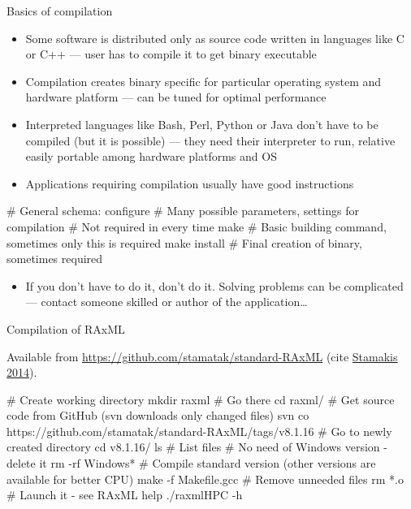 \documentclass[compress, ucs, xelatex, 11pt, xcolor=svgnames,
  hyperref={
    bookmarks=true,
    unicode=true,
    colorlinks=true,
    pdftitle={Linux, command line and MetaCentrum},
    plainpages=false,
    pdfauthor={Vojtech Zeisek},
    pdfsubject={Course about use of Linux command line, writing shell scripts and using MetaCentrum of CESNET},
    pdfcreator={XeLaTeX, http://www.xelatex.org/},
    pdfkeywords={Linux, GNU, BASH, shell, command line, MetaCentrum},
    linkcolor=Sienna,
    anchorcolor=black,
    citecolor=green,
    filecolor=magenta,
    menucolor=Sienna,
    urlcolor=cyan,
    pdftex},
  url={hyphens, lowtilde} %
  ]{beamer}
\begin{document}
\begin{frame}[fragile]{Basics of compilation}
\begin{itemize}
  \item Some software is distributed only as source code written in languages like C or C++ --- user has to compile it to get binary executable
  \item Compilation creates binary specific for particular operating system and hardware platform --- can be tuned for optimal performance
  \item Interpreted languages like Bash, Perl, Python or Java don't have to be compiled (but it is possible) --- they need their interpreter to run, relative easily portable among hardware platforms and OS
  \item Applications requiring compilation usually have good instructions
\end{itemize}
  \begin{bashcode}
    # General schema:
    configure # Many possible parameters, settings for compilation
              # Not required in every time
    make # Basic building command, sometimes only this is required
    make install # Final creation of binary, sometimes required
  \end{bashcode}
\begin{itemize}
  \item If you don't have to do it, don't do it. Solving problems can be complicated --- contact someone skilled or author of the application\ldots
\end{itemize}
\end{frame}

\begin{frame}[fragile]{Compilation of RAxML}
\begin{footnotesize}
  Available from \url{https://github.com/stamatak/standard-RAxML} (cite \href{https://bioinformatics.oxfordjournals.org/content/30/9/1312.abstract}{Stamakis 2014}).
\end{footnotesize}
  \begin{bashcode}
    # Create working directory
    mkdir raxml
    # Go there
    cd raxml/
    # Get source code from GitHub (svn downloads only changed files)
    svn co https://github.com/stamatak/standard-RAxML/tags/v8.1.16
    # Go to newly created directory
    cd v8.1.16/
    ls # List files
    # No need of Windows version - delete it
    rm -rf Windows*
    # Compile standard version (other versions are available for better CPU)
    make -f Makefile.gcc
    # Remove unneeded files
    rm *.o
    # Launch it - see RAxML help
    ./raxmlHPC -h
  \end{bashcode}
\end{frame}
\end{document}
